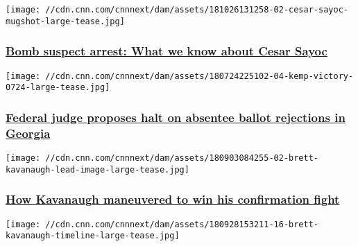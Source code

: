 \texttt{[image: //cdn.cnn.com/cnnnext/dam/assets/181026131258-02-cesar-sayoc-mugshot-large-tease.jpg]}

\hypertarget{bomb-suspect-arrest-what-we-know-about-cesar-sayoc}{%
\subsubsection{\texorpdfstring{\href{/2018/10/26/politics/suspicious-packages-arrest/index.html}{Bomb
suspect arrest: What we know about Cesar
Sayoc}}{Bomb suspect arrest: What we know about Cesar Sayoc}}\label{bomb-suspect-arrest-what-we-know-about-cesar-sayoc}}

\href{/2018/10/24/politics/georgia-absentee-voter-court-ruling-kemp-abrams/index.html}{}

\texttt{[image: //cdn.cnn.com/cnnnext/dam/assets/180724225102-04-kemp-victory-0724-large-tease.jpg]}

\hypertarget{federal-judge-proposes-halt-on-absentee-ballot-rejections-in-georgia-}{%
\subsubsection{\texorpdfstring{\href{/2018/10/24/politics/georgia-absentee-voter-court-ruling-kemp-abrams/index.html}{Federal
judge proposes halt on absentee ballot rejections in Georgia
}}{Federal judge proposes halt on absentee ballot rejections in Georgia }}\label{federal-judge-proposes-halt-on-absentee-ballot-rejections-in-georgia-}}

\href{/2018/10/06/politics/how-kavanaugh-maneuvered-to-win-his-confirmation-fight/index.html}{}

\texttt{[image: //cdn.cnn.com/cnnnext/dam/assets/180903084255-02-brett-kavanaugh-lead-image-large-tease.jpg]}

\hypertarget{how-kavanaugh-maneuvered-to-win-his-confirmation-fight}{%
\subsubsection{\texorpdfstring{\href{/2018/10/06/politics/how-kavanaugh-maneuvered-to-win-his-confirmation-fight/index.html}{How
Kavanaugh maneuvered to win his confirmation
fight}}{How Kavanaugh maneuvered to win his confirmation fight}}\label{how-kavanaugh-maneuvered-to-win-his-confirmation-fight}}

\href{/2018/10/02/politics/brett-kavanaugh-chris-dudley-police-report/index.html}{}

\texttt{[image: //cdn.cnn.com/cnnnext/dam/assets/180928153211-16-brett-kavanaugh-timeline-large-tease.jpg]}


